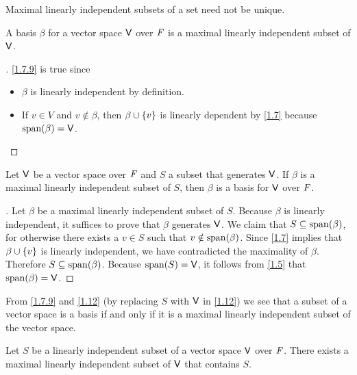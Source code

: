 \begin{note}
  Maximal linearly independent subsets of a set need not be unique.
\end{note}

\begin{eg}\label{1.7.9}
  A basis \(\beta\) for a vector space \(\mathsf{V}\) over \(\mathit{F}\) is a maximal linearly independent subset of \(\mathsf{V}\).
\end{eg}

\begin{proof}[]
  \cref{1.7.9} is true since
  \begin{itemize}
    \item \(\beta\) is linearly independent by definition.
    \item If \(v \in V\) and \(v \notin \beta\), then \(\beta \cup \left\lbrace v\right\rbrace\) is linearly dependent by \cref{1.7} because \(\spn{\beta} = \V\).
  \end{itemize}
\end{proof}

\begin{thm}\label{1.12}
  Let \(\mathsf{V}\) be a vector space over \(\mathit{F}\) and \(S\) a subset that generates \(\mathsf{V}\).
  If \(\beta\) is a maximal linearly independent subset of \(S\), then \(\beta\) is a basis for \(\mathsf{V}\) over \(\mathit{F}\).
\end{thm}

\begin{proof}[]
  Let \(\beta\) be a maximal linearly independent subset of \(S\).
  Because \(\beta\) is linearly independent, it suffices to prove that \(\beta\) generates \(\mathsf{V}\).
  We claim that \(S \subseteq \spn{\beta}\), for otherwise there exists a \(v \in S\) such that \(v \notin \spn{\beta}\).
  Since \cref{1.7} implies that \(\beta \cup \left\lbrace v\right\rbrace\) is linearly independent, we have contradicted the maximality of \(\beta\).
  Therefore \(S \subseteq \spn{\beta}\).
  Because \(\spn{S} = \V\), it follows from \cref{1.5} that \(\spn{\beta} = \V\).
\end{proof}

\begin{note}
  From \cref{1.7.9} and \cref{1.12} (by replacing \(S\) with \(\mathsf{V}\) in \cref{1.12}) we see that a subset of a vector space is a basis if and only if it is a maximal linearly independent subset of the vector space.
\end{note}

\begin{thm}\label{1.13}
  Let \(S\) be a linearly independent subset of a vector space \(\mathsf{V}\) over \(\mathit{F}\).
  There exists a maximal linearly independent subset of \(\mathsf{V}\) that contains \(S\).
\end{thm}

